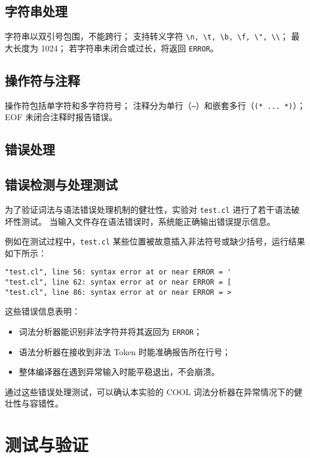 \documentclass[a4paper,12pt]{article}
\begin{document}
\subsection{字符串处理}
字符串以双引号包围，不能跨行；
支持转义字符 \texttt{\textbackslash n, \textbackslash t, \textbackslash b, \textbackslash f, \textbackslash ", \textbackslash\textbackslash}；
最大长度为 1024；
若字符串未闭合或过长，将返回 \texttt{ERROR}。

\subsection{操作符与注释}
操作符包括单字符和多字符符号；
注释分为单行（\texttt{--}）和嵌套多行（\texttt{(* ... *)}）；
EOF 未闭合注释时报告错误。

\subsection{错误处理}
\subsection{错误检测与处理测试}
为了验证词法与语法错误处理机制的健壮性，实验对 \texttt{test.cl} 进行了若干语法破坏性测试。
当输入文件存在语法错误时，系统能正确输出错误提示信息。

例如在测试过程中，\texttt{test.cl} 某些位置被故意插入非法符号或缺少括号，运行结果如下所示：

\begin{lstlisting}[basicstyle=\ttfamily\small]
"test.cl", line 56: syntax error at or near ERROR = '
"test.cl", line 62: syntax error at or near ERROR = [
"test.cl", line 86: syntax error at or near ERROR = >
\end{lstlisting}

这些错误信息表明：
\begin{itemize}
    \item 词法分析器能识别非法字符并将其返回为 \texttt{ERROR}；
    \item 语法分析器在接收到非法 Token 时能准确报告所在行号；
    \item 整体编译器在遇到异常输入时能平稳退出，不会崩溃。
\end{itemize}

通过这些错误处理测试，可以确认本实验的 COOL 词法分析器在异常情况下的健壮性与容错性。

\section{测试与验证}
\end{document}
